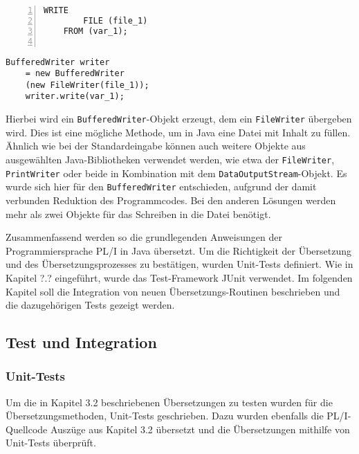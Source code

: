 \begin{minipage}[b]{0.48\linewidth}
	\centering
	\lstset{language=PL/I,label=SliceExaple}
	\begin{lstlisting}[frame=single, numbers=left, mathescape,%
		caption={Dateiausgabe}, label={lst:javawriter}]
	WRITE 
		FILE (file_1) 
	FROM (var_1);	
	
	\end{lstlisting}
\end{minipage}
\hspace{0.5cm}
\begin{minipage}[b]{0.48\linewidth}
	\centering
	\lstset{language=Java,label=SliceExaple}
	\begin{lstlisting}[frame=single, mathescape,%
		title={" "}]
	BufferedWriter writer 
	= new BufferedWriter
	(new FileWriter(file_1)); 
	writer.write(var_1);
	\end{lstlisting}
\end{minipage}  

Hierbei wird ein \verb+BufferedWriter+-Objekt erzeugt, dem ein \verb+FileWriter+ übergeben wird. Dies ist eine mögliche Methode, um in Java eine Datei mit Inhalt zu füllen. Ähnlich wie bei der Standardeingabe können auch weitere Objekte aus ausgewählten Java-Bibliotheken verwendet werden, wie etwa der \verb+FileWriter+, \verb+PrintWriter+ oder beide in Kombination mit dem \verb+DataOutputStream+-Objekt. Es wurde sich hier für den \verb+BufferedWriter+ entschieden, aufgrund der damit verbunden Reduktion des Programmcodes. Bei den anderen Lösungen werden mehr als zwei Objekte für das Schreiben in die Datei benötigt.

Zusammenfassend werden so die grundlegenden Anweisungen der Programmiersprache PL/I in Java übersetzt. Um die Richtigkeit der Übersetzung und des Übersetzungsprozesses zu bestätigen, wurden Unit-Tests definiert. Wie in Kapitel ?.? eingeführt, wurde das Test-Framework JUnit verwendet. Im folgenden Kapitel soll die Integration von neuen Übersetzungs-Routinen beschrieben und die dazugehörigen Tests gezeigt werden.

\pagebreak
\subsection{Test und Integration}
\subsubsection{Unit-Tests}
Um die in Kapitel 3.2 beschriebenen Übersetzungen zu testen wurden für die Übersetzungsmethoden, Unit-Tests geschrieben.
Dazu wurden ebenfalls die PL/I-Quellcode Auszüge aus Kapitel 3.2 übersetzt und die Übersetzungen mithilfe von Unit-Tests überprüft.

